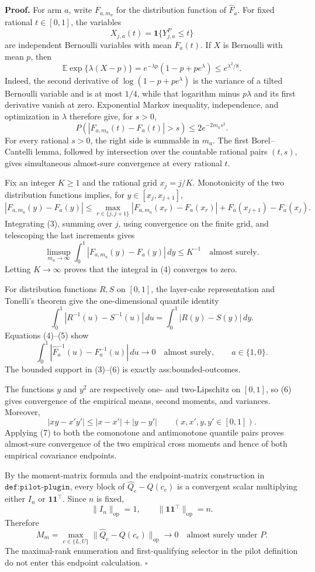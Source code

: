 \textbf{Proof.}
For arm \(a\), write \(F_{a,m_a}\) for the distribution function of \(\widehat F_a\).  For fixed rational \(t\in[0,1]\), the variables
\[
X_{j,a}(t)=\mathbf 1\{Y^P_{j,a}\le t\}
\]
are independent Bernoulli variables with mean \(F_a(t)\).  If \(X\) is Bernoulli with mean \(p\), then
\[
\mathbb E\exp\{\lambda(X-p)\}
=e^{-\lambda p}(1-p+pe^\lambda)\le e^{\lambda^2/8}.
\tag{1}
\]
Indeed, the second derivative of \(\log(1-p+pe^\lambda)\) is the variance of a tilted Bernoulli variable and is at most \(1/4\), while that logarithm minus \(p\lambda\) and its first derivative vanish at zero.  Exponential Markov inequality, independence, and optimization in \(\lambda\) therefore give, for \(s>0\),
\[
P\!\left(\left|F_{a,m_a}(t)-F_a(t)\right|>s\right)
\le2e^{-2m_as^2}.
\tag{2}
\]
For every rational \(s>0\), the right side is summable in \(m_a\).  The first Borel--Cantelli lemma, followed by intersection over the countable rational pairs \((t,s)\), gives simultaneous almost-sure convergence at every rational \(t\).

Fix an integer \(K\ge1\) and the rational grid \(x_j=j/K\).  Monotonicity of the two distribution functions implies, for \(y\in[x_j,x_{j+1}]\),
\[
|F_{a,m_a}(y)-F_a(y)|
\le
\max_{r\in\{j,j+1\}}|F_{a,m_a}(x_r)-F_a(x_r)|
+F_a(x_{j+1})-F_a(x_j).
\tag{3}
\]
Integrating (3), summing over \(j\), using convergence on the finite grid, and telescoping the last increments gives
\[
\limsup_{m_a\to\infty}
\int_0^1|F_{a,m_a}(y)-F_a(y)|\,dy\le K^{-1}
\quad\text{almost surely}.
\tag{4}
\]
Letting \(K\to\infty\) proves that the integral in (4) converges to zero.

For distribution functions \(R,S\) on \([0,1]\), the layer-cake representation and Tonelli's theorem give the one-dimensional quantile identity
\[
\int_0^1|R^{-1}(u)-S^{-1}(u)|\,du
=\int_0^1|R(y)-S(y)|\,dy.
\tag{5}
\]
Equations (4)--(5) show
\[
\int_0^1|\widehat F_a^{-1}(u)-F_a^{-1}(u)|\,du
\longrightarrow0
\quad\text{almost surely},
\qquad a\in\{1,0\}.
\tag{6}
\]
The bounded support in (3)--(6) is exactly ass:bounded-outcomes.

The functions \(y\) and \(y^2\) are respectively one- and two-Lipschitz on \([0,1]\), so (6) gives convergence of the empirical means, second moments, and variances.  Moreover,
\[
|xy-x'y'|\le|x-x'|+|y-y'|
\qquad(x,x',y,y'\in[0,1]).
\tag{7}
\]
Applying (7) to both the comonotone and antimonotone quantile pairs proves almost-sure convergence of the two empirical cross moments and hence of both empirical covariance endpoints.

By the moment-matrix formula and the endpoint-matrix construction in \(\texttt{def:pilot-plugin}\), every block of \(\widehat Q_e-Q(c_e)\) is a convergent scalar multiplying either \(I_n\) or \(\mathbf1\mathbf1^{\top}\).  Since \(n\) is fixed,
\[
\lVert I_n\rVert_{\mathrm{op}}=1,
\qquad
\lVert\mathbf1\mathbf1^{\top}\rVert_{\mathrm{op}}=n.
\tag{8}
\]
Therefore
\[
M_m=\max_{e\in\{L,U\}}
\lVert\widehat Q_e-Q(c_e)\rVert_{\mathrm{op}}
\longrightarrow0
\quad\text{almost surely under }P.
\tag{9}
\]
The maximal-rank enumeration and first-qualifying selector in the pilot definition do not enter this endpoint calculation. \(\square\)